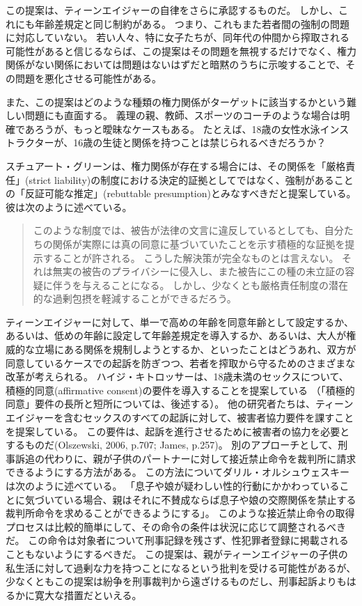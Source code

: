 \documentclass[paper=a4,book,openany]{jlreq}
\newcommand{\ig}[1]{}           %
\begin{document}
この提案は、ティーンエイジャーの自律をさらに承認するものだ。
しかし、これにも年齢差規定と同じ制約がある。
つまり、これもまた若者間の強制の問題に対応していない。
若い人々、特に女子たちが、同年代の仲間から搾取される可能性があると信じるならば、この提案はその問題を無視するだけでなく、権力関係がない関係においては問題はないはずだと暗黙のうちに示唆することで、その問題を悪化させる可能性がある。

また、この提案はどのような種類の権力関係がターゲットに該当するかという難しい問題にも直面する。
義理の親、教師、スポーツのコーチのような場合は明確であろうが、もっと曖昧なケースもある。
たとえば、18歳の女性水泳インストラクターが、16歳の生徒と関係を持つことは禁じられるべきだろうか？

スチュアート・グリーン\ig{Stuart Green}は、権力関係が存在する場合には、その関係を「厳格責任」(strict liability)の制度における決定的証拠としてではなく、強制があることの「反証可能な推定」(rebuttable presumption)とみなすべきだと提案している。
彼は次のように述べている。

\begin{quote}
このような制度では、被告が法律の文言に違反しているとしても、自分たちの関係が実際には真の同意に基づいていたことを示す積極的な証拠を提示することが許される。
こうした解決策が完全なものとは言えない。
それは無実の被告のプライバシーに侵入し、また被告にこの種の未立証の容疑に伴うを与えることになる。
しかし、少なくとも厳格責任制度の潜在的な過剰包摂を軽減することができるだろう。
\citep{green17:_how_crimin_inces}
\end{quote}

ティーンエイジャーに対して、単一で高めの年齢を同意年齢として設定するか、あるいは、低めの年齢に設定して年齢差規定を導入するか、あるいは、大人が権威的な立場にある関係を規制しようとするか、といったことはどうあれ、双方が同意しているケースでの起訴を防ぎつつ、若者を搾取から守るためのさまざまな改革が考えられる。
ハイジ・キトロッサーは、18歳未満のセックスについて、積極的同意(affirmative consent)の要件を導入することを提案している\citep{kitrosser97:_meanin_consen}
（「積極的同意」要件の長所と短所については、後述する）。
他の研究者たちは、ティーンエイジャーを含むセックスのすべての起訴に対して、被害者協力要件を課すことを提案している。
この要件は、起訴を進行させるために被害者の協力を必要とするものだ(Olszewski, 2006, p.707; James, p.257)。
\nocite{olszewski06:_commen_statut_rape_wiscon}\nocite{james09:_romeo_juliet_were_sex_offen}
別のアプローチとして、刑事訴追の代わりに、親が子供のパートナーに対して接近禁止命令を裁判所に請求できるようにする方法がある。
この方法についてダリル・オルシュウェスキーは次のように述べている。
「息子や娘が疑わしい性的行動にかかわっていることに気づいている場合、親はそれに不賛成ならば息子や娘の交際関係を禁止する裁判所命令を求めることができるようにする」\citep[p.718]{olszewski06:_commen_statut_rape_wiscon}。
このような接近禁止命令の取得プロセスは比較的簡単にして、その命令の条件は状況に応じて調整されるべきだ。
この命令は対象者について刑事記録を残さず、性犯罪者登録に掲載されることもないようにするべきだ。
この提案は、親がティーンエイジャーの子供の私生活に対して過剰な力を持つことになるという批判を受ける可能性があるが、少なくともこの提案は紛争を刑事裁判から遠ざけるものだし、刑事起訴よりもはるかに寛大な措置だといえる。
\end{document}
